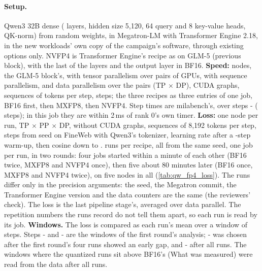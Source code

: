 \paragraph{Setup.} Qwen3 32B dense (\TriQwFpFourLayers{} layers, hidden size 5,120, 64 query and 8 key-value heads, QK-norm) from random weights, in Megatron-LM with Transformer Engine 2.18, in the new workloads' own copy of the campaign's software, through existing options only. NVFP4 is Transformer Engine's recipe as on GLM-5 (previous block), with the last \TriQwFpFourBfLast{} of the \TriQwFpFourLayers{} layers and the output layer in BF16. \textbf{Speed:} \TriQwFpFourNodes{} nodes, the GLM-5 block's, with tensor parallelism over pairs of GPUs, with sequence parallelism, and data parallelism over the \TriQwFpFourDp{} pairs (TP\TriQwFpFourTp{} $\times$ DP\TriQwFpFourDp), CUDA graphs, \TriQwFpFourSeqs{} sequences of \TriQwFpFourSeqLen{} tokens per step, \TriQwFpFourSteps{} steps; the three recipes as three entries of one job, BF16 first, then MXFP8, then NVFP4. Step times are milabench's, over steps \TriQwFpFourFrom-\TriQwFpFourSteps{} (\TriQwFpFourMeasured{} steps); in this job they are within 2\,ms of rank 0's own timer. \textbf{Loss:} one node per run, TP\TriQwFpFourLTp{} $\times$ PP\TriQwFpFourLPp{} $\times$ DP\TriQwFpFourLDp, without CUDA graphs, \TriQwFpFourLSeqs{} sequences of 8,192 tokens per step, \TriQwFpFourLSteps{} steps from seed \TriQwFpFourLSeed{} on FineWeb with Qwen3's tokenizer, learning rate \TriQwFpFourLLr{} after a \TriQwFpFourLWarm-step warm-up, then cosine down to \TriQwFpFourLMinLr. \TriQwFpFourLRuns{} runs per recipe, all from the same seed, one job per run, in two rounds: four jobs started within a minute of each other (BF16 twice, MXFP8 and NVFP4 once), then five about 80 minutes later (BF16 once, MXFP8 and NVFP4 twice), on five nodes in all (\cref{tab:qw_fp4_loss}). The runs differ only in the precision arguments: the seed, the Megatron commit, the Transformer Engine version and the data counters are the same (the reviewers' check). The loss is the last pipeline stage's, averaged over data parallel. The repetition numbers the runs record do not tell them apart, so each run is read by its job. \textbf{Windows.} The loss is compared as each run's mean over a window of steps. Steps \TriQwFpFourWinLateFrom-\TriQwFpFourWinLateTo{} and \TriQwFpFourWinEndFrom-\TriQwFpFourWinEndTo{} are the windows of the first round's analysis; \TriQwFpFourWinEarlyFrom-\TriQwFpFourWinEarlyTo{} was chosen after the first round's four runs showed an early gap, and \TriQwFpFourWinMidFrom-\TriQwFpFourWinMidTo{} after all \TriQwFpFourLJobs{} runs. The windows where the quantized runs sit above BF16's (What was measured) were read from the data after all \TriQwFpFourLJobs{} runs.


